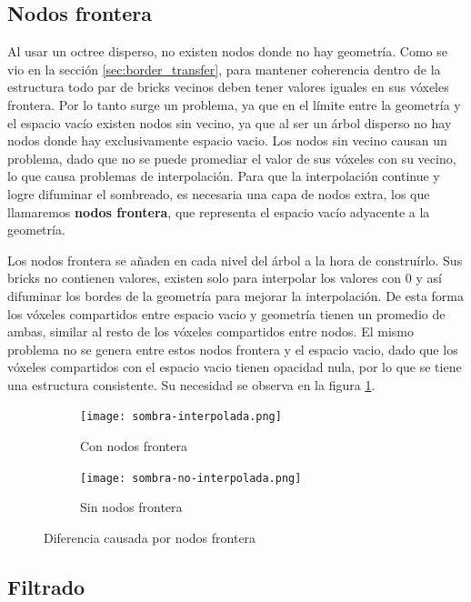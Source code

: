 \subsection{Nodos frontera}

Al usar un octree disperso, no existen nodos donde no hay geometría.
Como se vio en la sección \ref{sec:border_transfer}, para mantener coherencia dentro de la estructura todo par de bricks vecinos deben tener valores iguales en sus vóxeles frontera.
Por lo tanto surge un problema, ya que en el límite entre la geometría y el espacio vacío existen nodos sin vecino, ya que al ser un árbol disperso no hay nodos donde hay exclusivamente espacio vacio.
Los nodos sin vecino causan un problema, dado que no se puede promediar el valor de sus vóxeles con su vecino, lo que causa problemas de interpolación.
Para que la interpolación continue y logre difuminar el sombreado, es necesaria una capa de nodos extra, los que llamaremos \textbf{nodos frontera}, que representa el espacio vacío adyacente a la geometría.

Los nodos frontera se añaden en cada nivel del árbol a la hora de construírlo.
Sus bricks no contienen valores, existen solo para interpolar los valores con 0 y así difuminar los bordes de la geometría para mejorar la interpolación.
De esta forma los vóxeles compartidos entre espacio vacio y geometría tienen un promedio de ambas, similar al resto de los vóxeles compartidos entre nodos.
El mismo problema no se genera entre estos nodos frontera y el espacio vacio, dado que los vóxeles compartidos con el espacio vacio tienen opacidad nula, por lo que se tiene una estructura consistente.
Su necesidad se observa en la figura \ref{fig:nodos_frontera}.

\begin{figure}
    \begin{subfigure}{.5\textwidth}
        \centering
        \texttt{[image: sombra-interpolada.png]}
        \caption{Con nodos frontera}
    \end{subfigure}
    \begin{subfigure}{.5\textwidth}
        \centering
        \texttt{[image: sombra-no-interpolada.png]}
        \caption{Sin nodos frontera}
    \end{subfigure}
    \caption{Diferencia causada por nodos frontera}
    \label{fig:nodos_frontera}
\end{figure}

\subsection{Filtrado}\label{design:filtering}

